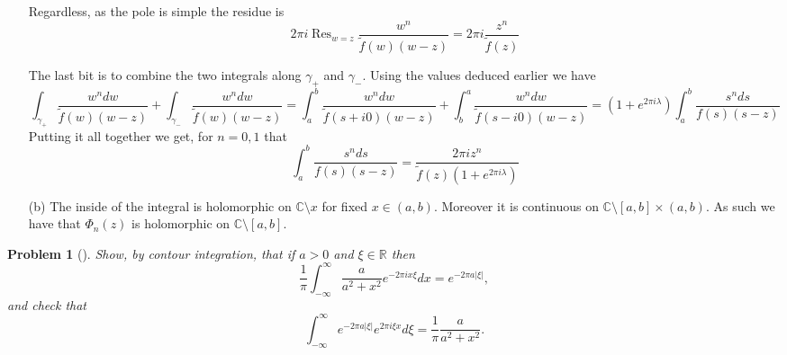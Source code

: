 \documentclass[10pt]{article}
\newcommand{\sk}{\vskip 10mm}
\newcommand{\bb}[1]{\mathbb{#1}}
\newcommand{\wt}[1]{\widetilde{#1}}
\DeclareMathOperator{\res}{Res}
\theoremstyle{plain}
\newtheorem{problem}{Problem}
\theoremstyle{remark}
\begin{document}
\begin{enumerate}
  Regardless, as the pole is simple the residue is
  \[
    2\pi i\res_{w=z}\frac{w^n }{\wt{f}(w)(w-z)} = 2\pi i\frac{z^n}{\wt{f}(z)}
  \]

  The last bit is to combine the two integrals along $\gamma_+$ and $\gamma_-$. Using
  the values deduced earlier we have
  \[
    \int_{\gamma_+} \frac{w^n dw}{\wt{f}(w)(w-z)}+ \int_{\gamma_-}\frac{w^n dw}{\wt{f}(w)(w-z)} = \int_a^b \frac{w^n dw}{\wt{f}(s+i0)(w-z)}+ \int_b^a\frac{w^n dw}{\wt{f}(s-i0)(w-z)} =
    (1+e^{2\pi i \lambda})\int_a^b\frac{s^nds}{f(s)(s-z)}
  \]
  Putting it all together we get, for $n=0,1$ that
  \[
    \int_a^b\frac{s^nds}{f(s)(s-z)}=\frac{2\pi i z^n}{\wt{f}(z)(1+e^{2\pi i \lambda})}
  \]

\item[(b)] The inside of the integral is holomorphic on $\bb{C}\setminus x$ for fixed $x\in(a,b)$.
  Moreover it is continuous on $\bb{C}\setminus[a,b]\times(a,b)$. As such we have that $\Phi_n(z)$ is holomorphic
  on $\bb{C}\setminus[a,b]$.
\end{enumerate}

\sk

\begin{problem}[]
  Show, by contour integration, that if $a >0$ and $\xi \in \mathbb{R}$ then
  \[
    \frac{1}{\pi} \int_{-\infty}^\infty \frac{a}{a^2 + x^2}e^{-2\pi ix\xi}dx = e^{-2\pi a |\xi|},
  \]
  and check that 
  \[
    \int_{-\infty}^\infty e^{-2\pi a|\xi|}e^{2\pi i\xi x}d\xi = \frac{1}{\pi}\frac{a}{a^2 + x^2}.
  \]
\end{problem}
\end{document}
